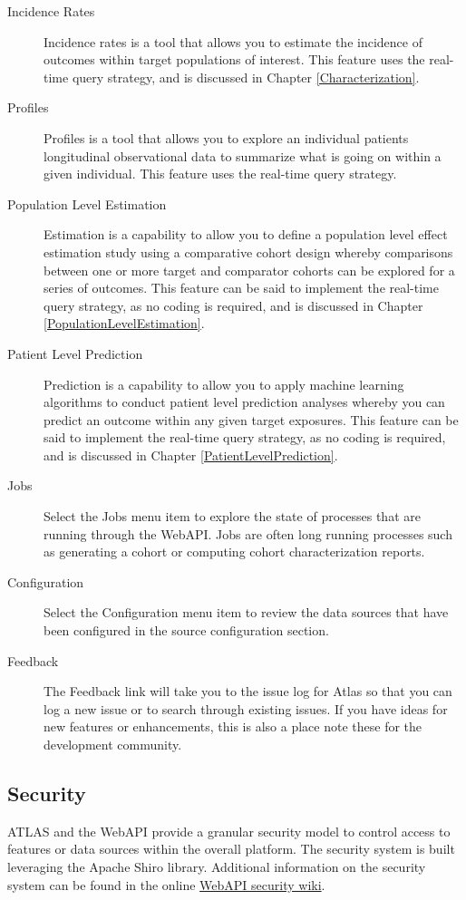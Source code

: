 \documentclass[11pt]{book}
\theoremstyle{definition}
\theoremstyle{definition}
\theoremstyle{definition}
\theoremstyle{remark}
\begin{document}
\begin{description}
\item[Incidence Rates]
Incidence rates is a tool that allows you to estimate the incidence of outcomes within target populations of interest. This feature uses the real-time query strategy, and is discussed in Chapter \ref{Characterization}.
\item[Profiles]
Profiles is a tool that allows you to explore an individual patients longitudinal observational data to summarize what is going on within a given individual. This feature uses the real-time query strategy.
\item[Population Level Estimation]
Estimation is a capability to allow you to define a population level effect estimation study using a comparative cohort design whereby comparisons between one or more target and comparator cohorts can be explored for a series of outcomes. This feature can be said to implement the real-time query strategy, as no coding is required, and is discussed in Chapter \ref{PopulationLevelEstimation}.
\item[Patient Level Prediction]
Prediction is a capability to allow you to apply machine learning algorithms to conduct patient level prediction analyses whereby you can predict an outcome within any given target exposures. This feature can be said to implement the real-time query strategy, as no coding is required, and is discussed in Chapter \ref{PatientLevelPrediction}.
\item[Jobs]
Select the Jobs menu item to explore the state of processes that are running through the WebAPI. Jobs are often long running processes such as generating a cohort or computing cohort characterization reports.
\item[Configuration]
Select the Configuration menu item to review the data sources that have been configured in the source configuration section.
\item[Feedback]
The Feedback link will take you to the issue log for Atlas so that you can log a new issue or to search through existing issues. If you have ideas for new features or enhancements, this is also a place note these for the development community.
\end{description}

\hypertarget{security}{%
\subsection{Security}\label{security}}

ATLAS and the WebAPI provide a granular security model to control access to features or data sources within the overall platform. The security system is built leveraging the Apache Shiro library. Additional information on the security system can be found in the online \href{https://github.com/OHDSI/WebAPI/wiki/Security-Configuration}{WebAPI security wiki}.
\end{document}
